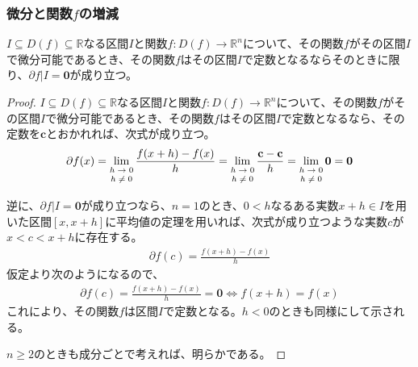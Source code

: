 \documentclass[dvipdfmx]{jsarticle}
\begin{document}
\subsubsection{微分と関数$f$の増減}%
\begin{thm}\label{4.2.2.4}
$I \subseteq D(f) \subseteq \mathbb{R}$なる区間$I$と関数$f:D(f) \rightarrow \mathbb{R}^{n}$について、その関数$f$がその区間$I$で微分可能であるとき、その関数$f$はその区間$I$で定数となるならそのときに限り、$\partial f|I = \mathbf{0}$が成り立つ。
\end{thm}
\begin{proof}
$I \subseteq D(f) \subseteq \mathbb{R}$なる区間$I$と関数$f:D(f) \rightarrow \mathbb{R}^{n}$について、その関数$f$がその区間$I$で微分可能であるとき、その関数$f$はその区間$I$で定数となるなら、その定数を$\mathbf{c}$とおかれれば、次式が成り立つ。
\begin{align*}
\partial f(x) = \lim_{\scriptsize \begin{matrix}
h \rightarrow 0 \\
h \neq 0 \\
\end{matrix}}\frac{f(x + h) - f(x)}{h} = \lim_{\scriptsize \begin{matrix}
h \rightarrow 0 \\
h \neq 0 \\
\end{matrix}}\frac{\mathbf{c} - \mathbf{c}}{h} = \lim_{\scriptsize \begin{matrix}
h \rightarrow 0 \\
h \neq 0 \\
\end{matrix}}\mathbf{0} = \mathbf{0}
\end{align*}\par
逆に、$\partial f|I = \mathbf{0}$が成り立つなら、$n = 1$のとき、$0 < h$なるある実数$x + h \in I$を用いた区間$[ x,x + h]$に平均値の定理を用いれば、次式が成り立つような実数$c$が$x < c < x + h$に存在する。
\begin{align*}
\partial f(c) = \frac{f(x + h) - f(x)}{h}
\end{align*}
仮定より次のようになるので、
\begin{align*}
\partial f(c) = \frac{f(x + h) - f(x)}{h} = \mathbf{0} \Leftrightarrow f(x + h) = f(x)
\end{align*}
これにより、その関数$f$は区間$I$で定数となる。$h < 0$のときも同様にして示される。\par
$n \geq 2$のときも成分ごとで考えれば、明らかである。
\end{proof}
\end{document}
